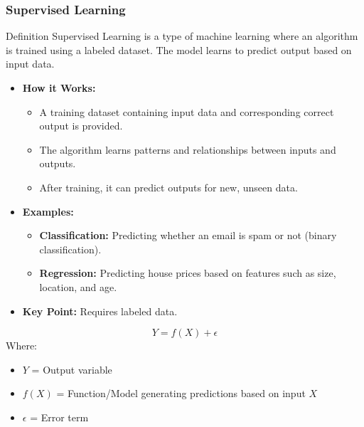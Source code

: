 \documentclass[aspectratio=169]{beamer}
\begin{document}
\begin{frame}[fragile]
    \frametitle{Supervised Learning}
    \begin{block}{Definition}
        Supervised Learning is a type of machine learning where an algorithm is trained using a labeled dataset. The model learns to predict output based on input data.
    \end{block}
    
    \begin{itemize}
        \item \textbf{How it Works:}
        \begin{itemize}
            \item A training dataset containing input data and corresponding correct output is provided.
            \item The algorithm learns patterns and relationships between inputs and outputs.
            \item After training, it can predict outputs for new, unseen data.
        \end{itemize}
        
        \item \textbf{Examples:}
        \begin{itemize}
            \item \textbf{Classification:} Predicting whether an email is spam or not (binary classification).
            \item \textbf{Regression:} Predicting house prices based on features such as size, location, and age.
        \end{itemize}
        
        \item \textbf{Key Point:} Requires labeled data.
    \end{itemize}
    
    \begin{equation}
        Y = f(X) + \epsilon 
    \end{equation}
    Where:
    \begin{itemize}
        \item $Y$ = Output variable
        \item $f(X)$ = Function/Model generating predictions based on input $X$
        \item $\epsilon$ = Error term
    \end{itemize}
\end{frame}
\end{document}
